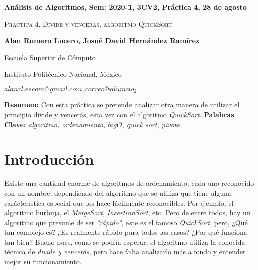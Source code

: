 \documentclass[12pt,twoside]{article}
\date{}
\begin{document}
\centerline{\bf An\'alisis de Algoritmos, Sem: 2020-1, 3CV2, Pr\'actica 4, 28 de agosto}
\centerline{}
\centerline{}
\begin{center}
\Large{\textsc{Pr\'actica 4. Divide y vencer\'as, algoritmo QuickSort}}
\end{center}
\centerline{\bf{Alan Romero Lucero, Josu\'e David Hern\'andez Ram\'irez}}
\centerline{}
\centerline{Escuela Superior de C\'omputo}
\centerline{Instituto Polit\'ecnico Nacional, M\'exico}
\centerline{$alanrl.escom@gmail.com, correo@alumno_2$}
\newtheorem{Theorem}{\quad Theorem}[section]
\newtheorem{Definition}[Theorem]{\quad Definition}
\newtheorem{Corollary}[Theorem]{\quad Corollary}
\newtheorem{Lemma}[Theorem]{\quad Lemma}
\newtheorem{Example}[Theorem]{\quad Example}
\bigskip
\textbf{Resumen:} Con esta pr\'actica se pretende analizar otra manera de utilizar el principio divide y vencer\'as, esta vez con el algoritmo \textit{QuickSort}.
{\bf Palabras Clave:} {\textit{algoritmo, ordenamiento, $big O$, quick sort, pivote}}
\section{Introducci\'on}
Existe una cantidad enorme de algoritmos de ordenamiento, cada uno reconocido con un nombre, dependiendo del algoritmo que se utiliza que tiene alguna car\'acter\'istica especial que los hace f\'acilmente reconocibles. Por ejemplo, el algoritmo burbuja, el \textit{MergeSort}, \textit{InsertionSort}, etc. Pero de entre todos, hay un algoritmo que presume de ser \textit{"r\'apido"}, este es el famoso \textit{QuickSort}, pero, ¿Qu\'e tan complejo es? ¿Es realmente r\'apido para todos los casos? ¿Por qu\'e funciona tan bien? Bueno pues, como se podr\'ia esperar, el algoritmo utiliza la conocida t\'ecnica de \textit{divide y vencer\'as}, pero hace falta analizarlo m\'as a fondo y entender mejor su funcionamiento.
\end{document}
